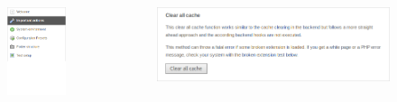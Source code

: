 \begin{frame}[fragile]
	\begin{columns}[T]
		\begin{column}{.3\textwidth}
			\begin{figure}\vspace*{-0.4cm}
				\includegraphics[width=0.7\linewidth]{Images/InstallTool/ImportantActionsCropped1.png}
			\end{figure}
		\end{column}
		\begin{column}{.7\textwidth}
			\begin{figure}\vspace*{-0.4cm}
				\includegraphics[width=0.9\linewidth]{Images/InstallTool/ClearAllCache.png}
			\end{figure}
		\end{column}
	\end{columns}

\end{frame}

